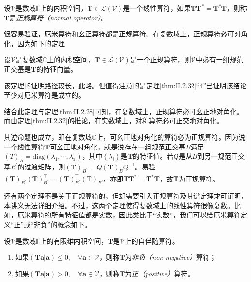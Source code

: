 \documentclass[main.tex]{subfiles}
\begin{document}
\begin{definition}[正规算符]\label{def:II.2.24}
    设$\mathcal{V}$是数域$\mathbb{F}$上的内积空间，$\mathbf{T}\in\mathcal{L}\left(\mathcal{V}\right)$是一个线性算符，如果$\mathbf{TT}^*=\mathbf{T}^*\mathbf{T}$，则称$\mathbf{T}$是\emph{正规算符（normal operator）}。
\end{definition}

很容易验证，厄米算符和幺正算符都是正规算符。在复数域上，正规算符必可对角化，因为如下的定理

\begin{theorem}\label{thm:II.2.35}
    设$\mathcal{V}$是复数域$\mathbb{C}$上的内积空间，$\mathbf{T}\in\mathcal{L}\left(\mathcal{V}\right)$是一个正规算符，则$\mathcal{V}$中必有一组规范正交基是$\mathbf{T}$的特征向量。
\end{theorem}

该定理的证明路径较长，此略\cite[\S 8.5 Theorem 22]{Hoffman1971}。但值得注意的是定理\ref{thm:II.2.32}“4”已证明该结论至少对厄米算符是成立的。

结合此定理与定理\ref{thm:II.2.28}可知，在复数域上，正规算符必可幺正地对角化。而由定理\ref{thm:II.2.32}的推论，在实数域上，对称算符必可正交地对角化。

其逆命题也成立，即在复数域$\mathbb{C}$上，可幺正地对角化的算符必为正规算符。因为说一个线性算符$\mathbf{T}$可幺正地对角化，就是说存在一组规范正交基$B$满足$\left(T\right)_B=\mathrm{diag}\left(\lambda_1,\cdots,\lambda_n\right)$，其中$\left\{\lambda_i\right\}$是$\mathbf{T}$的特征值。若$Q$是从$B$到另一规范正交基$B^\prime$的过渡矩阵，则$\left(\mathbf{T}\right)_{B^\prime}=Q\left(\mathbf{T}\right)_{B}Q^{-1}$。易验$\left(\mathbf{T}\right)_{B^\prime}\overline{\left(\mathbf{T}\right)^\intercal_{B^\prime}}=\overline{\left(\mathbf{T}\right)^\intercal_{B^\prime}}\left(\mathbf{T}\right)_{B^\prime}$，亦即$\mathbf{TT}^*=\mathbf{T}^*\mathbf{T}$，故$\mathbf{T}$为正规算符。

还有两个定理不是关于正规算符的，但却需要引入正规算符及其谱定理才可证明，本讲义无法详细介绍。不过，这两个定理使得复数域上的线性算符很像复数。比如，厄米算符的所有特征值都是实数，因此类比于“实数”，我们可以给厄米算符定义“正”或“非负”的概念如下。

\begin{definition}\label{def:II.2.25}
    设$\mathcal{V}$是数域$\mathbb{F}$上的有限维内积空间，$\mathbf{T}$是$\mathcal{V}$上的自伴随算符。
    \begin{enumerate}
        \item 如果$\left(\mathbf{Ta}|\mathbf{a}\right)\leq 0,\quad\forall\mathbf{a}\in\mathcal{V}$，则称$\mathbf{T}$为\emph{非负（non-negative）}算符；
        \item 如果$\left(\mathbf{Ta}|\mathbf{a}\right)> 0,\quad\forall\mathbf{a}\in\mathcal{V}$，则称$\mathbf{T}$为\emph{正（positive）}算符。
    \end{enumerate}
\end{definition}
\end{document}
